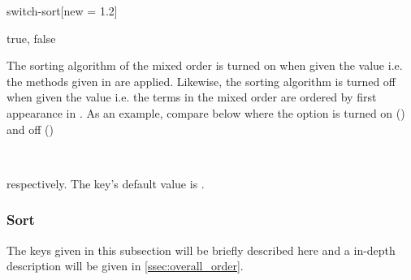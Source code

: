 	\begin{option}{switch-sort}[new = 1.2]
		\begin{values}[default = true]
			true, false
		\end{values}
		The sorting algorithm of the mixed order is turned on when given the value  i.e. the methods given in  are applied. Likewise, the sorting algorithm is turned off when given the value  i.e. the terms in the mixed order are ordered by first appearance in . As an example, compare below where the option is turned on () and off ()
		
		\begin{example}
			 \\
		\end{example}
		
		\noindent respectively. The key's default value is .
	\end{option}
	
	\subsubsection*{Sort}
	The keys given in this subsection will be briefly described here and a in-depth description will be given in \cref{ssec:overall_order}.
	
